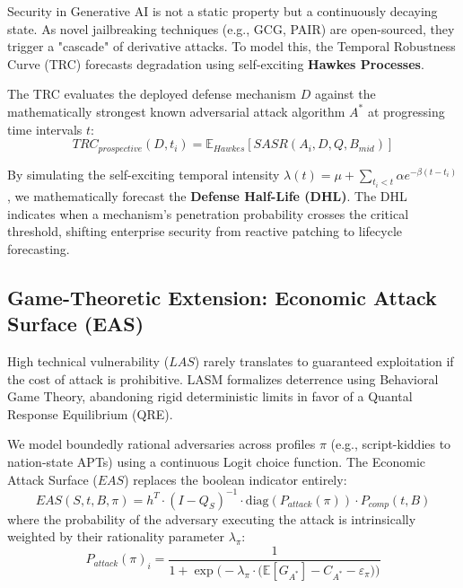 Security in Generative AI is not a static property but a continuously decaying state. As novel jailbreaking techniques (e.g., GCG, PAIR) are open-sourced, they trigger a "cascade" of derivative attacks. To model this, the Temporal Robustness Curve (TRC) forecasts degradation using self-exciting \textbf{Hawkes Processes}.

The TRC evaluates the deployed defense mechanism $D$ against the mathematically strongest known adversarial attack algorithm $A^*$ at progressing time intervals $t$:
\begin{equation}
    TRC_{prospective}(D, t_i) = \mathbb{E}_{Hawkes}[SASR(A_i, D, Q, B_{mid})]
\end{equation}

By simulating the self-exciting temporal intensity $\lambda(t) = \mu + \sum_{t_i < t} \alpha e^{-\beta(t-t_i)}$, we mathematically forecast the \textbf{Defense Half-Life (DHL)}. The DHL indicates when a mechanism's penetration probability crosses the critical threshold, shifting enterprise security from reactive patching to lifecycle forecasting.

\subsection{Game-Theoretic Extension: Economic Attack Surface (EAS)}
\label{subsec:eas}

High technical vulnerability ($LAS$) rarely translates to guaranteed exploitation if the cost of attack is prohibitive. LASM formalizes deterrence using Behavioral Game Theory, abandoning rigid deterministic limits in favor of a Quantal Response Equilibrium (QRE).

We model boundedly rational adversaries across profiles $\pi$ (e.g., script-kiddies to nation-state APTs) using a continuous Logit choice function. The Economic Attack Surface ($EAS$) replaces the boolean indicator entirely:
\begin{equation}
    EAS(S, t, B, \pi) = h^T \cdot (I - Q_S)^{-1} \cdot \text{diag}(P_{attack}(\pi)) \cdot P_{comp}(t, B)
\end{equation}
where the probability of the adversary executing the attack is intrinsically weighted by their rationality parameter $\lambda_\pi$:
\begin{equation}
    P_{attack}(\pi)_i = \frac{1}{1 + \exp\Big(-\lambda_\pi \cdot \big( \mathbb{E}[G_{A^*}] - C_{A^*} - \varepsilon_\pi \big) \Big)}
\end{equation}

